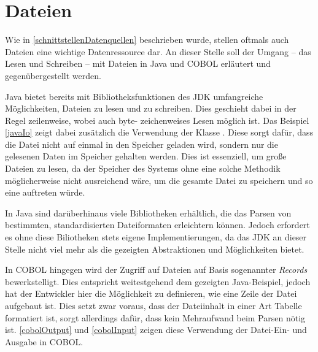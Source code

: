 \section{Dateien}
Wie in \autoref{schnittstellenDatenquellen} beschrieben wurde, stellen oftmals auch Dateien eine wichtige Datenressource dar. An dieser Stelle soll der Umgang -- das Lesen und Schreiben -- mit Dateien in Java und COBOL erläutert und gegenübergestellt werden.

Java bietet bereits mit Bibliotheksfunktionen des JDK umfangreiche Möglichkeiten, Dateien zu lesen und zu schreiben. Dies geschieht dabei in der Regel zeilenweise, wobei auch byte- \bzw zeichenweises Lesen möglich ist. Das Beispiel \autoref{javaIo} zeigt dabei zusätzlich die Verwendung der Klasse . Diese sorgt dafür, dass die Datei nicht auf einmal in den Speicher geladen wird, sondern nur die gelesenen Daten im Speicher gehalten werden. Dies ist essenziell, um große Dateien zu lesen, da der Speicher des Systems ohne eine solche Methodik möglicherweise nicht ausreichend wäre, um die gesamte Datei zu speichern und so eine  auftreten würde.


In Java sind darüberhinaus viele Bibliotheken erhältlich, die das Parsen von bestimmten, standardisierten Dateiformaten erleichtern können. Jedoch erfordert es ohne diese Biliotheken stets eigene Implementierungen, da das JDK an dieser Stelle nicht viel mehr als die gezeigten Abstraktionen und Möglichkeiten bietet.

In COBOL hingegen wird der Zugriff auf Dateien auf Basis sogenannter \textit{Records} bewerkstelligt. Dies entspricht weitestgehend dem gezeigten Java-Beispiel, jedoch hat der Entwickler hier die Möglichkeit zu definieren, wie eine Zeile der Datei aufgebaut ist. Dies setzt zwar voraus, dass der Dateiinhalt in einer Art Tabelle formatiert ist, sorgt allerdings dafür, dass kein Mehraufwand beim Parsen nötig ist. \autoref{cobolOutput} und \autoref{cobolInput} zeigen diese Verwendung der Datei-Ein- und Ausgabe in COBOL.





